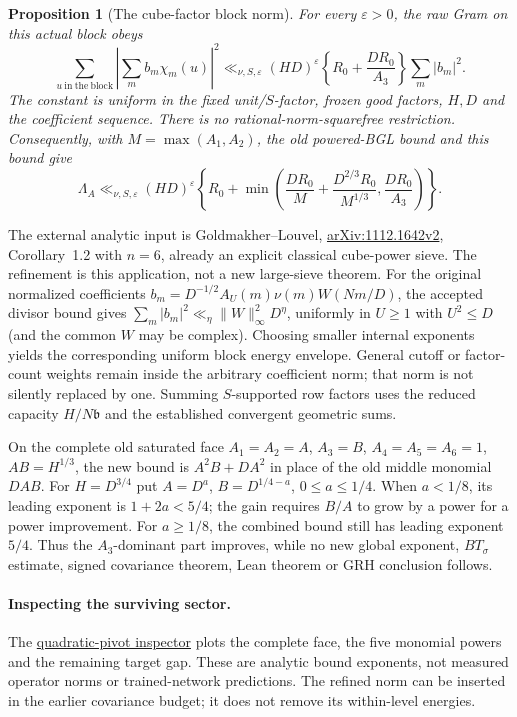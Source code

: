 \documentclass[11pt,oneside,openany]{book}
\newtheorem{proposition}[theorem]{Proposition}
\theoremstyle{definition}\newtheorem{definition}[theorem]{Definition}
\theoremstyle{remark}\newtheorem{remark}[theorem]{Remark}
\begin{document}
\begin{proposition}[The cube-factor block norm]\label{qp:bound}
For every $\varepsilon>0$, the raw Gram on this actual block obeys
\[
 \sum_{u\ \mathrm{in\ the\ block}}
       \left|\sum_m b_m\chi_m(u)\right|^2
 \ll_{\nu,S,\varepsilon}(HD)^\varepsilon
       \left\{R_0+\frac{DR_0}{A_3}\right\}\sum_m|b_m|^2.
\]
The constant is uniform in the fixed unit/$S$-factor, frozen good factors,
$H,D$ and the coefficient sequence. There is no rational-norm-squarefree
restriction. Consequently, with $M=\max(A_1,A_2)$, the old powered-BGL
bound and this bound give
\begin{equation}\label{qp:min}
 \Lambda_A\ll_{\nu,S,\varepsilon}(HD)^\varepsilon
 \left\{R_0+\min\left(
  \frac{DR_0}{M}+\frac{D^{2/3}R_0}{M^{1/3}},
  \frac{DR_0}{A_3}\right)\right\}.
\end{equation}
\end{proposition}
The external analytic input is Goldmakher--Louvel,
\href{https://arxiv.org/pdf/1112.1642v2}{arXiv:1112.1642v2},
Corollary~1.2 with $n=6$, already an explicit classical cube-power sieve.
The refinement is this application, not a new large-sieve theorem.
For the original normalized coefficients
$b_m=D^{-1/2}A_U(m)\nu(m)W(Nm/D)$, the accepted divisor bound gives
$\sum_m|b_m|^2\ll_\eta\|W\|_\infty^2D^\eta$, uniformly in
$U\ge1$ with $U^2\le D$ (and the common $W$ may be complex).
Choosing smaller internal exponents yields the corresponding uniform
block energy envelope. General cutoff or factor-count weights remain
inside the arbitrary coefficient norm; that norm is not silently replaced
by one. Summing $S$-supported row factors uses the reduced capacity
$H/N\mathfrak b$ and the established convergent geometric sums.

On the complete old saturated face $A_1=A_2=A$, $A_3=B$,
$A_4=A_5=A_6=1$, $AB=H^{1/3}$, the new bound is
$A^2B+DA^2$ in place of the old middle monomial $DAB$.
For $H=D^{3/4}$ put $A=D^a$, $B=D^{1/4-a}$,
$0\le a\le1/4$. When $a<1/8$, its leading exponent is $1+2a<5/4$;
the gain requires $B/A$ to grow by a power for a power improvement.
For $a\ge1/8$, the combined bound still has leading exponent $5/4$.
Thus the $A_3$-dominant part improves, while no new global exponent,
$BT_\sigma$ estimate, signed covariance theorem, Lean theorem or GRH
conclusion follows.

\paragraph{Inspecting the surviving sector.}
The \href{https://amelie-iska.github.io/GRH-research/quadratic-pivot.html}{quadratic-pivot inspector} plots the complete face, the five monomial powers and the remaining target gap. These are analytic bound exponents, not measured operator norms or trained-network predictions. The refined norm can be inserted in the earlier covariance budget; it does not remove its within-level energies.
\end{document}
